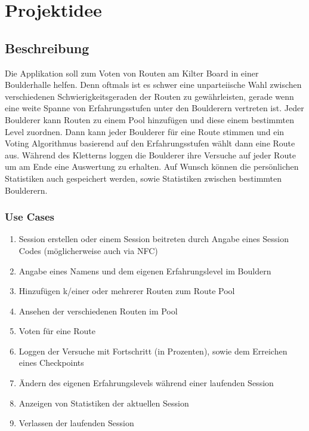 \documentclass[11pt,a4paper,headsepline,footsepline,bibliography=totocnumbered]{article}
\begin{document}
\pagebreak
\tableofcontents

\newpage

\section{Projektidee}

  \subsection{Beschreibung}
    \par
      Die Applikation soll zum Voten von Routen am Kilter Board in einer Boulderhalle helfen.
      Denn oftmals ist es schwer eine unparteiische Wahl zwischen verschiedenen Schwierigkeitsgeraden der Routen zu gewährleisten, gerade wenn eine weite Spanne von Erfahrungsstufen unter den Boulderern vertreten ist.
      Jeder Boulderer kann Routen zu einem Pool hinzufügen und diese einem bestimmten Level zuordnen.
      Dann kann jeder Boulderer für eine Route stimmen und ein Voting Algorithmus basierend auf den Erfahrungsstufen wählt dann eine Route aus.
      Während des Kletterns loggen die Boulderer ihre Versuche auf jeder Route um am Ende eine Auswertung zu erhalten.
      Auf Wunsch können die persönlichen Statistiken auch gespeichert werden, sowie Statistiken zwischen bestimmten Boulderern.

    \subsubsection{Use Cases}
      \begin{enumerate}
        \item Session erstellen oder einem Session beitreten durch Angabe eines Session Codes (möglicherweise auch via NFC)
        \item Angabe eines Namens und dem eigenen Erfahrungslevel im Bouldern
        \item Hinzufügen k/einer oder mehrerer Routen zum Route Pool
        \item Ansehen der verschiedenen Routen im Pool
        \item Voten für eine Route
        \item Loggen der Versuche mit Fortschritt (in Prozenten), sowie dem Erreichen eines Checkpoints
        \item Ändern des eigenen Erfahrungslevels während einer laufenden Session
        \item Anzeigen von Statistiken der aktuellen Session
        \item Verlassen der laufenden Session
      \end{enumerate}
\end{document}
